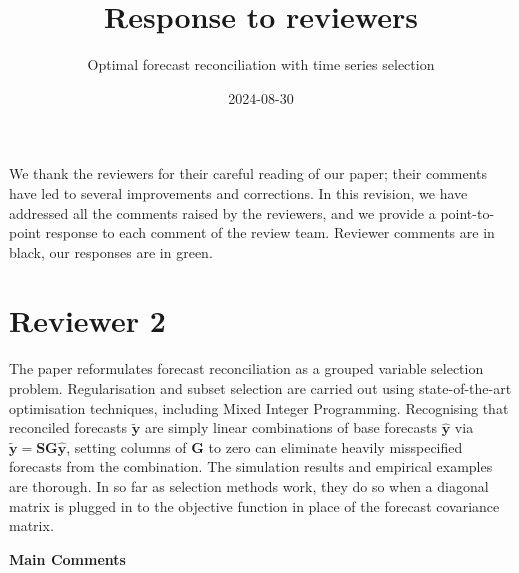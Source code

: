 \documentclass[11pt,a4paper,]{article}
\title{Response to reviewers}
\author{Optimal forecast reconciliation with time series selection}
\date{2024-08-30}
\begin{document}
\vspace*{-2cm}
\begin{snugshade}\sffamily
\maketitle
\end{snugshade}\vspace*{0.5cm}


We thank the reviewers for their careful reading of our paper; their
comments have led to several improvements and corrections. In this
revision, we have addressed all the comments raised by the reviewers,
and we provide a point-to-point response to each comment of the review
team. Reviewer comments are in black, our responses are in green.

\section*{Reviewer 2}\label{reviewer-2}

The paper reformulates forecast reconciliation as a grouped variable
selection problem. Regularisation and subset selection are carried out
using state-of-the-art optimisation techniques, including Mixed Integer
Programming. Recognising that reconciled forecasts \(\tilde{\bm{y}}\)
are simply linear combinations of base forecasts \(\hat{\bm{y}}\) via
\(\tilde{\bm{y}}=\bm{SG}\hat{\bm{y}}\), setting columns of \(\bm{G}\) to
zero can eliminate heavily misspecified forecasts from the combination.
The simulation results and empirical examples are thorough. In so far as
selection methods work, they do so when a diagonal matrix is plugged in
to the objective function in place of the forecast covariance matrix.

\textbf{Main Comments}
\end{document}
